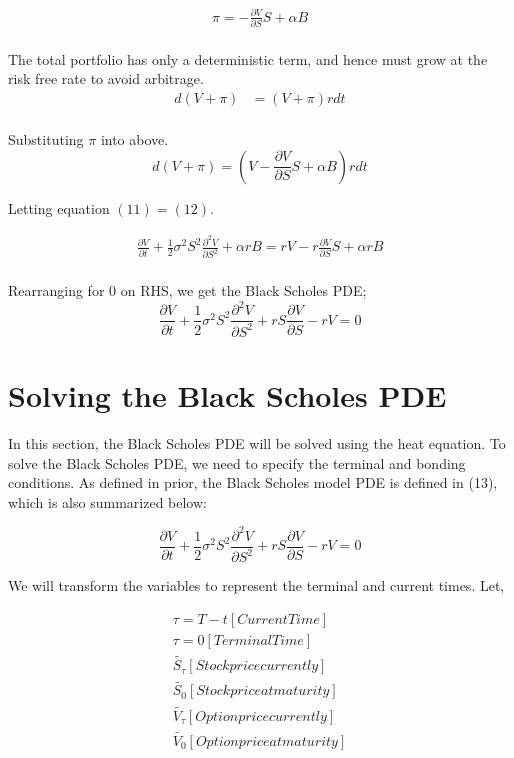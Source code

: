 \documentclass[12pt]{article}
\begin{document}
\begin{align*}
\pi = -\frac{\partial V}{\partial S}S + \alpha B \\
\end{align*}

The total portfolio has only a deterministic term, and hence must grow at the risk free rate to avoid arbitrage. 
\begin{align*}
d(V + \pi) &= (V + \pi)rdt \\
\end{align*}

Substituting $\pi$ into above.
\begin{equation}
d(V + \pi) = (V - \frac{\partial V}{\partial S}S + \alpha B)rdt
\end{equation}

Letting equation $(11) = (12)$.

\begin{align*}
\frac{\partial V}{\partial t} + \frac{1}{2}\sigma^2 S^2 \frac{\partial ^2 V}{\partial S^2}+\alpha rB = rV - r \frac{\partial V}{\partial S}S + \alpha rB \\
\end{align*}

Rearranging for 0 on RHS, we get the Black Scholes PDE;
\begin{equation}
\frac{\partial V}{\partial t} + \frac{1}{2}\sigma^2 S^2 \frac{\partial ^2 V}{\partial S^2} + rS \frac{\partial V}{\partial S} - rV = 0
\end{equation}

\section{Solving the Black Scholes PDE}
In this section, the Black Scholes PDE will be solved using the heat equation. To solve the Black Scholes PDE, we need to specify the terminal and bonding conditions. As defined in prior, the Black Scholes model PDE is defined in (13), which is also summarized below:

\begin{equation}
\frac{\partial V}{\partial t} + \frac{1}{2}\sigma^2 S^2 \frac{\partial ^2 V}{\partial S^2} + rS \frac{\partial V}{\partial S} - rV = 0
\end{equation}

We will transform the variables to represent the terminal and current times. Let,

\begin{align*}
\tau = T - t [Current Time] \\
\tau = 0 [Terminal Time] \\
\tilde{S_{\tau}} [Stock price currently] \\
\tilde{S_{0}}[Stock price at maturity] \\
\tilde{V_{\tau}} [Option price currently] \\
\tilde{V_{0}} [Option price at maturity] \\
\end{align*}
\end{document}

